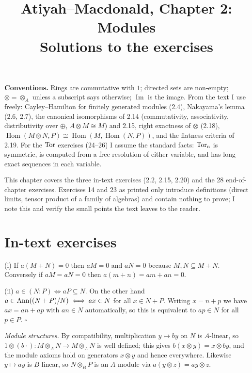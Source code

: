 \documentclass[11pt]{article}
\title{Atiyah--Macdonald, Chapter 2: Modules\\[2pt]\large Solutions to the exercises}
\author{}
\date{}
\begin{document}
\maketitle
\noindent\textbf{Conventions.} Rings are commutative with $1$; directed sets are non-empty; $\otimes=\otimes_A$ unless a subscript says otherwise; $\operatorname{Im}$ is the image. From the text I use freely: Cayley--Hamilton for finitely generated modules (2.4), Nakayama's lemma (2.6, 2.7), the canonical isomorphisms of 2.14 (commutativity, associativity, distributivity over $\oplus$, $A\otimes M\cong M$) and 2.15, right exactness of $\otimes$ (2.18), $\operatorname{Hom}(M\otimes N,P)\cong\operatorname{Hom}(M,\operatorname{Hom}(N,P))$, and the flatness criteria of 2.19. For the $\operatorname{Tor}$ exercises (24--26) I assume the standard facts: $\operatorname{Tor}_n$ is symmetric, is computed from a free resolution of either variable, and has long exact sequences in each variable.

This chapter covers the three in-text exercises (2.2, 2.15, 2.20) and the 28 end-of-chapter exercises. Exercises 14 and 23 as printed only introduce definitions (direct limits, tensor product of a family of algebras) and contain nothing to prove; I note this and verify the small points the text leaves to the reader.

\section*{In-text exercises}

\pf
(i) If $a(M+N)=0$ then $aM=0$ and $aN=0$ because $M,N\subseteq M+N$. Conversely if $aM=aN=0$ then $a(m+n)=am+an=0$.

(ii) $a\in(N:P)\iff aP\subseteq N$. On the other hand $a\in\operatorname{Ann}((N+P)/N)\iff ax\in N$ for all $x\in N+P$. Writing $x=n+p$ we have $ax=an+ap$ with $an\in N$ automatically, so this is equivalent to $ap\in N$ for all $p\in P$. \hfill$\square$

\pf
\emph{Module structures.} By compatibility, multiplication $y\mapsto by$ on $N$ is $A$-linear, so $1\otimes(b\cdot):M\otimes_AN\to M\otimes_AN$ is well defined; this gives $b(x\otimes y)=x\otimes by$, and the module axioms hold on generators $x\otimes y$ and hence everywhere. Likewise $y\mapsto ay$ is $B$-linear, so $N\otimes_BP$ is an $A$-module via $a(y\otimes z)=ay\otimes z$.
\end{document}
